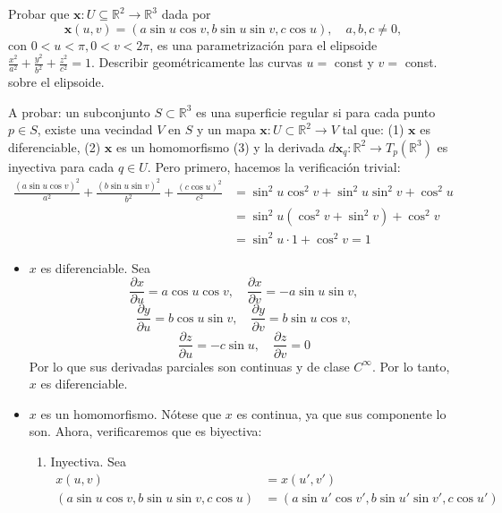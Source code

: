 \begin{problema}
    Probar que $\mathbf{x}: U \subseteq \mathbb{R}^2 \rightarrow \mathbb{R}^3$ dada por
$$
\mathbf{x}(u, v)=(a \sin u \cos v, b \sin u \sin v, c \cos u), \quad a, b, c \neq 0,
$$
con $0<u<\pi, 0<v<2 \pi$, es una parametrización para el elipsoide $\frac{x^2}{a^2}+\frac{y^2}{b^2}+\frac{z^2}{c^2}=1$. Describir geométricamente las curvas $u=$ const y $v=$ const. sobre el elipsoide.
\begin{sol}
    A probar: un subconjunto $S \subset \mathbb{R}^3$ es una superficie regular si para cada punto $p \in S$, existe una vecindad $V$ en $S$ y un mapa $\mathbf{x}: U \subset \mathbb{R}^2 \rightarrow V$ tal que: (1) $\mathbf{x}$ es diferenciable, (2) $\mathbf{x}$ es un homomorfismo (3) y la derivada $d\mathbf{x}_q: \mathbb{R}^2 \rightarrow T_p(\mathbb{R}^3)$ es inyectiva para cada $q\in U$.
    Pero primero, hacemos la verificación trivial: 
    $$\begin{aligned} \frac{(a \sin u \cos v)^2}{a^2}+\frac{(b \sin u \sin v)^2}{b^2}+\frac{(c \cos u)^2}{c^2} & =\sin ^2 u \cos ^2 v+\sin ^2 u \sin ^2 v+\cos ^2 u \\ & =\sin ^2 u\left(\cos ^2 v+\sin ^2 v\right)+\cos ^2 v \\ & =\sin ^2 u \cdot 1+\cos ^2 v=1\end{aligned}$$
    \begin{itemize}
        \item $x$ es diferenciable. Sea  $$ \frac{\partial x}{\partial u}=a \cos u \cos v,\quad \frac{\partial x}{\partial v}=-a \sin u \sin v, $$ $$ \frac{\partial y}{\partial u}=b \cos u \sin v,\quad \frac{\partial y}{\partial v}=b \sin u \cos v, $$  $$ \frac{\partial z}{\partial u}=-c \sin u,\quad \frac{\partial z}{\partial v}= 0 $$
        Por lo que sus derivadas parciales son continuas y de clase $C^\infty$. Por lo tanto, $x$ es diferenciable. 
        \item  $x$ es un homomorfismo. Nótese que $x$ es continua, ya que sus componente lo son. Ahora, verificaremos que es biyectiva: 
        \begin{enumerate}
            \item Inyectiva. Sea 
            \begin{align*}
                x(u,v) &= x(u',v')\\
                (a \sin u \cos v, b \sin u \sin v, c \cos u) &= (a \sin u' \cos v', b \sin u' \sin v', c \cos u')\\
            \end{align*}

\end{enumerate}
\end{itemize}
\end{sol}
\end{problema}
